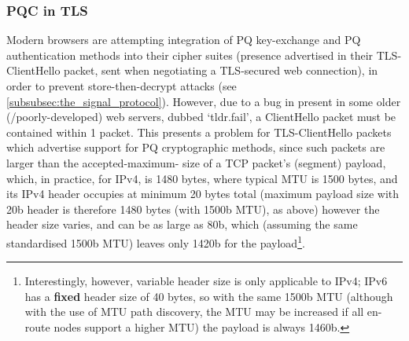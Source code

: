 \subsubsection{PQC in TLS}
\label{subsubsec:pqc_in_tls}
Modern browsers are attempting integration of PQ key-exchange and PQ authentication methods into their cipher suites (presence advertised in their TLS-ClientHello packet, sent when negotiating a TLS-secured web connection), in order to prevent store-then-decrypt attacks (see \cref{subsubsec:the_signal_protocol}). However, due to a bug in present in some older (/poorly-developed) web servers, dubbed `tldr.fail', a ClientHello packet must be contained within 1 packet. This presents a problem for TLS-ClientHello packets which advertise support for PQ cryptographic methods, since such packets are larger than the accepted-maximum- size of a TCP packet's (segment) payload, which, in practice, for IPv4, is 1480 bytes, where typical MTU is 1500 bytes, and its IPv4 header occupies at minimum 20 bytes total (maximum payload size with 20b header is therefore 1480 bytes (with 1500b MTU), as above) however the header size varies, and can be as large as 80b, which (assuming the same standardised 1500b MTU) leaves only 1420b for the payload\footnote{Interestingly, however, variable header size is only applicable to IPv4; IPv6 has a \textbf{fixed} header size of 40 bytes, so with the same 1500b MTU (although with the use of MTU path discovery, the MTU may be increased if all en-route nodes support a higher MTU) the payload is always 1460b.}.\\
